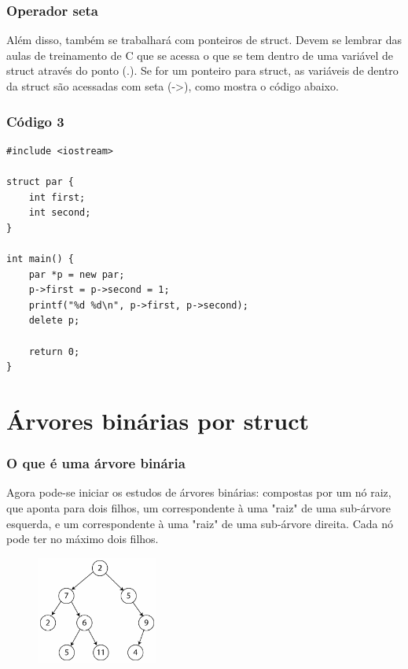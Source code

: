 \documentclass{beamer}
\begin{document}
	\begin{frame}
	\frametitle{Operador seta}
	Além disso, também se trabalhará com ponteiros de struct.
	Devem se lembrar das aulas de treinamento de C que se acessa
	o que se tem dentro de uma variável de struct através do ponto
	(.). Se for um ponteiro para struct, as variáveis de dentro da
	struct são acessadas com seta (->), como mostra o código
	abaixo.
	\end{frame}

	\begin{frame}[fragile]
	\frametitle{Código 3}
		\begin{lstlisting}
#include <iostream>

struct par {
    int first;
    int second;
}

int main() {
    par *p = new par;
    p->first = p->second = 1;
    printf("%d %d\n", p->first, p->second);
    delete p;

    return 0;
}
		\end{lstlisting}
	\end{frame}

	\section{Árvores binárias por struct}
	\begin{frame}
	\frametitle{O que é uma árvore binária}
		Agora pode-se iniciar os estudos de árvores binárias:
		compostas por um nó raiz, que aponta para dois filhos, um
		correspondente à uma "raiz" de uma sub-árvore esquerda, e um
		correspondente à uma "raiz" de uma sub-árvore direita. Cada
		nó pode ter no máximo dois filhos.

		\begin{figure}[H]
			\centering
			\includegraphics[width=4cm]{binary_tree.png}
		\end{figure}
	\end{frame}
\end{document}
